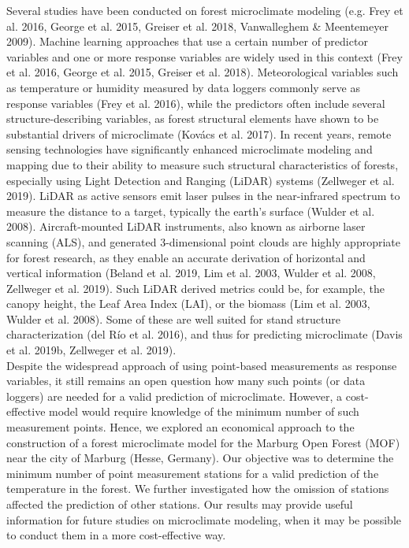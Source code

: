 \documentclass[5p]{elsarticle} %
\begin{document}
Several studies have been conducted on forest microclimate modeling (e.g. Frey et al. 2016, George et al. 2015, Greiser et al. 2018, Vanwalleghem \& Meentemeyer 2009). Machine learning approaches that use a certain number of predictor variables and one or more response variables are widely used in this context (Frey et al. 2016, George et al. 2015, Greiser et al. 2018). Meteorological variables such as temperature or humidity measured by data loggers commonly serve as response variables (Frey et al. 2016), while the predictors often include several structure-describing variables, as forest structural elements have shown to be substantial drivers of microclimate (Kovács et al. 2017). In recent years, remote sensing technologies have significantly enhanced microclimate modeling and mapping due to their ability to measure such structural characteristics of forests, especially using Light Detection and Ranging (LiDAR) systems (Zellweger et al. 2019). LiDAR as active sensors emit laser pulses in the near-infrared spectrum to measure the distance to a target, typically the earth’s surface (Wulder et al. 2008). Aircraft-mounted LiDAR instruments, also known as airborne laser scanning (ALS), and generated 3-dimensional point clouds are highly appropriate for forest research, as they enable an accurate derivation of horizontal and vertical information (Beland et al. 2019, Lim et al. 2003, Wulder et al. 2008, Zellweger et al. 2019). Such LiDAR derived metrics could be, for example, the canopy height, the Leaf Area Index (LAI), or the biomass (Lim et al. 2003, Wulder et al. 2008). Some of these are well suited for stand structure characterization (del Río et al. 2016), and thus for predicting microclimate (Davis et al. 2019b, Zellweger et al. 2019).\\
Despite the widespread approach of using point-based measurements as response variables, it still remains an open question how many such points (or data loggers) are needed for a valid prediction of microclimate. However, a cost-effective model would require knowledge of the minimum number of such measurement points. Hence, we explored an economical approach to the construction of a forest microclimate model for the Marburg Open Forest (MOF) near the city of Marburg (Hesse, Germany). Our objective was to determine the minimum number of point measurement stations for a valid prediction of the temperature in the forest. We further investigated how the omission of stations affected the prediction of other stations. Our results may provide useful information for future studies on microclimate modeling, when it may be possible to conduct them in a more cost-effective way.
\end{document}
